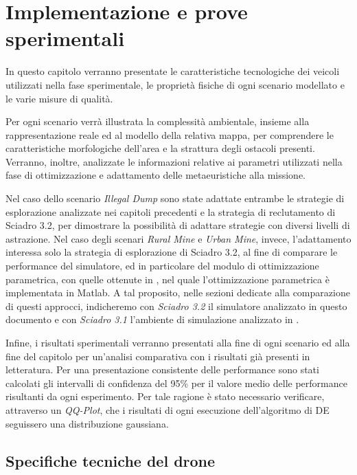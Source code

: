 \chapter{Implementazione e prove sperimentali}

In questo capitolo verranno presentate le caratteristiche tecnologiche dei veicoli utilizzati nella fase sperimentale, le proprietà fisiche di ogni scenario modellato e le varie misure di qualità.

Per ogni scenario verrà illustrata la complessità ambientale, insieme alla rappresentazione reale ed al modello della relativa mappa, per comprendere le caratteristiche morfologiche dell'area e la strattura degli ostacoli presenti.
Verranno, inoltre, analizzate le informazioni relative ai parametri utilizzati nella fase di ottimizzazione e adattamento delle metaeuristiche alla missione.

Nel caso dello scenario \textit{Illegal Dump} sono state adattate entrambe le strategie di esplorazione analizzate nei capitoli precedenti e la strategia di reclutamento di Sciadro 3.2, per dimostrare la possibilità di adattare strategie con diversi livelli di astrazione.
Nel caso degli scenari \textit{Rural Mine} e \textit{Urban Mine}, invece, l'adattamento interessa solo la strategia di esplorazione di Sciadro 3.2, al fine di comparare le performance del simulatore, ed in particolare del modulo di ottimizzazione parametrica, con quelle ottenute in \cite{cimino2019adaptive}, nel quale l'ottimizzazione parametrica è implementata in Matlab.
A tal proposito, nelle sezioni dedicate alla comparazione di questi approcci, indicheremo con \textit{Sciadro 3.2} il simulatore analizzato in questo documento e con \textit{Sciadro 3.1} l'ambiente di simulazione analizzato in \cite{cimino2019adaptive}.

Infine, i risultati sperimentali verranno presentati alla fine di ogni scenario ed alla fine del capitolo per un'analisi comparativa con i risultati già presenti in letteratura.
Per una presentazione consistente delle performance sono stati calcolati gli intervalli di confidenza del 95\% per il valore medio delle performance risultanti da ogni esperimento.
Per tale ragione è stato necessario verificare, attraverso un \textit{QQ-Plot}, che i risultati di ogni esecuzione dell'algoritmo di DE seguissero una distribuzione gaussiana.

\section{Specifiche tecniche del drone}

